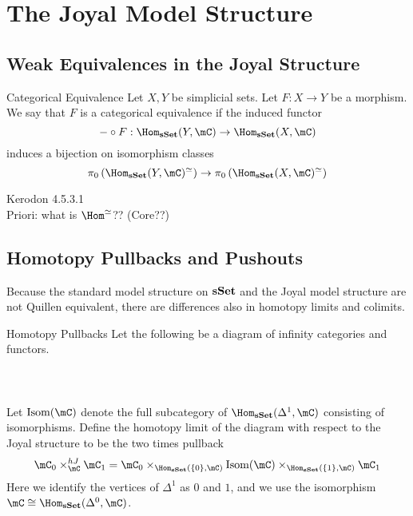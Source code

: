 \documentclass[a4paper]{article}
\begin{document}
\pagebreak
\section{The Joyal Model Structure}
\subsection{Weak Equivalences in the Joyal Structure}
\begin{defn}{Categorical Equivalence}{} Let $X,Y$ be simplicial sets. Let $F:X\to Y$ be a morphism. We say that $F$ is a categorical equivalence if the induced functor $$-\circ F:\Hom_\bold{sSet}(Y,\mC)\to\Hom_\bold{sSet}(X,\mC)$$ induces a bijection on isomorphism classes $$\pi_0\left(\Hom_\bold{sSet}(Y,\mC)^\simeq\right)\to\pi_0\left(\Hom_\bold{sSet}(X,\mC)^\simeq\right)$$
\end{defn}

Kerodon 4.5.3.1\\

Priori: what is $\Hom^\simeq$?? (Core??)

\subsection{Homotopy Pullbacks and Pushouts}
Because the standard model structure on $\bold{sSet}$ and the Joyal model structure are not Quillen equivalent, there are differences also in homotopy limits and colimits. 

\begin{defn}{Homotopy Pullbacks}{} Let the following be a diagram of infinity categories and functors. \\~\\
\\~\\
Let $\text{Isom}(\mC)$ denote the full subcategory of $\Hom_\bold{sSet}(\Delta^1,\mC)$ consisting of isomorphisms. Define the homotopy limit of the diagram with respect to the Joyal structure to be the two times pullback $$\mC_0\times_\mC^{hJ}\mC_1=\mC_0\times_{\Hom_\bold{sSet}(\{0\},\mC)}\text{Isom}(\mC)\times_{\Hom_\bold{sSet}(\{1\},\mC)}\mC_1$$ Here we identify the vertices of $\Delta^1$ as $0$ and $1$, and we use the isomorphism $\mC\cong\Hom_\bold{sSet}(\Delta^0,\mC)$. 
\end{defn}
\end{document}
